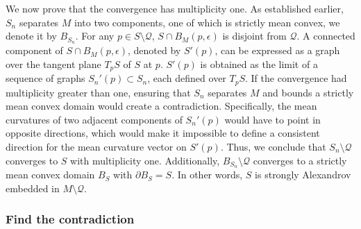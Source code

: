 \documentclass[12pt,a4paper]{amsart}
\numberwithin{equation}{section}
\theoremstyle{plain}
\theoremstyle{named}
\theoremstyle{definition}
\begin{document}
     We now prove that the convergence has multiplicity one. As established earlier, $S_n$ separates $M$ into two components, one of which is strictly mean convex, we denote it by $B_{S_n}$. For any $p\in S\setminus\mathcal{Q}$, $S\cap B_M(p,\epsilon)$ is disjoint from $\mathcal{Q}$. A connected component of $S\cap B_M(p,\epsilon)$, denoted by $S'(p)$, can be expressed as a graph over the tangent plane $T_pS$ of $S$ at $p$. $S'(p)$ is obtained as the limit of a sequence of graphs $S_n'(p)\subset S_n$, each defined over $T_pS$. If the convergence had multiplicity greater than one, ensuring that $S_n$ separates $M$ and bounds a strictly mean convex domain would create a contradiction. Specifically, the mean curvatures of two adjacent components of $S_n'(p)$ would have to point in opposite directions, which would make it impossible to define a consistent direction for the mean curvature vector on $S'(p)$. Thus, we conclude that $S_n\setminus\mathcal{Q}$ converges to $S$ with multiplicity one. Additionally, $B_{S_n}\setminus\mathcal{Q}$ converges to a strictly mean convex domain $B_S$ with $\partial B_S=S$. In other words, $S$ is strongly Alexandrov embedded in $M\setminus\mathcal{Q}$.

     
     \subsubsection{Find the contradiction}\label{subsection_contradiction}
     
\end{document}
